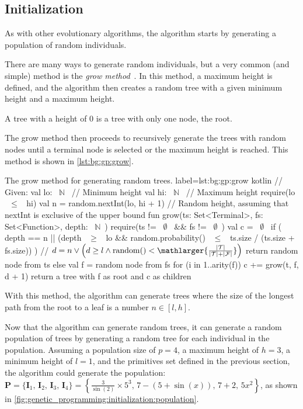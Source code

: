 \subsection{Initialization}
\label{sec:genetic_programming:initialization}
  As with other evolutionary algorithms, the algorithm starts by generating a
  population of random individuals.
  
  There are many ways to generate random individuals, but a very common (and
  simple) method is the \emph{grow 
  method}~\autocite{kozaGeneticProgrammingProgramming1992a}.
  In this method, a maximum height is defined, and the algorithm then creates a
  random tree with a given minimum height and a maximum height.

  \begin{remark}
    A tree with a height of 0 is a tree with only one node, the root.
  \end{remark}

  The grow method then proceeds to recursively generate the trees with random
  nodes until a terminal node is selected or the maximum height is reached.
  This method is shown in \vref{lst:bg:gp:grow}.

  \begin{code}{
    The grow method for generating random trees.
  }{
    label=lst:bg:gp:grow
  }{kotlin}
    // Given:
    val lo: ~$\mathbb{N}$~ // Minimum height
    val hi: ~$\mathbb{N}$~ // Maximum height
    require(lo ~$\leq$~ hi)
    val n = random.nextInt(lo, hi + 1) // Random height, assuming that nextInt is exclusive of the upper bound
    fun grow(ts: Set<Terminal>, fs: Set<Function>, depth: ~$\mathbb{N}$~) {
      require(ts != ~$\emptyset$~ && fs != ~$\emptyset$~)
      val c = ~$\emptyset$~
      if (
        depth == n || (depth ~$\geq$~ lo && random.probability() ~$\leq$~ ts.size / (ts.size + fs.size))
      ) {
      // $d = n \lor \left(d \geq l \land \mathrm{random}() < \mathlarger{\frac{|\mathcal{T}|}{|\mathcal{T}| + |\mathcal{F}|}}\right)$
        return random node from ts
      } else {
        val f = random node from fs
        for (i in 1..arity(f)) {
          c += grow(t, f, d + 1)
        }
        return a tree with f as root and c as children
      }
    }
  \end{code}

  With this method, the algorithm can generate trees where the size of the 
  longest path from the root to a leaf is a number \(n \in [l, h]\).

  Now that the algorithm can generate random trees, it can generate a random
  population of trees by generating a random tree for each individual in the
  population.
  Assuming a population size of \(p = 4\), a maximum height of \(h = 3\), a
  minimum height of \(l = 1\), and the primitives set defined in the previous
  section, the algorithm could generate the population: 
  \(
    \mathbf{P} = \{\mathbf{I}_1,\,\mathbf{I}_2,\,\mathbf{I}_3,\,\mathbf{I}_4\} 
      = \left\{
        \frac{3}{\sin(2)} \times 5^3,\,
        7 - (5 + \sin(x)),\,
        7 + 2,\,
        5x^2
      \right\}
  \), as shown in \vref{fig:genetic_programming:initialization:population}.

